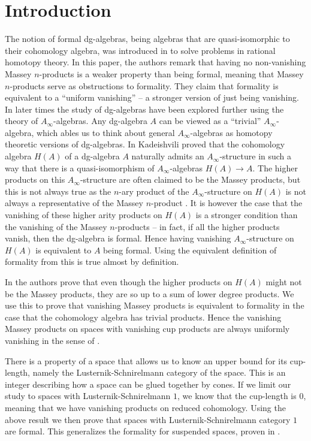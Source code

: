 
\section{Introduction}

The notion of formal dg-algebras, being algebras that are quasi-isomorphic to their cohomology 
algebra, was introduced in \cite{DGMS} to solve problems in rational homotopy theory. In 
this paper, the authors remark that having no non-vanishing Massey 
$n$-products is a weaker property than being formal, meaning that Massey $n$-products 
serve as obstructions to formality. They claim that formality is equivalent to a 
``uniform vanishing'' – a stronger version of just being vanishing. In later times 
the study of dg-algebras have been explored further using the theory of 
$A_\infty$-algebras. Any dg-algebra $A$ can be viewed as a ``trivial'' 
$A_\infty$-algebra, which ables us to think about general $A_\infty$-algebras as homotopy 
theoretic versions of dg-algebras. In \cite{kadeishvili} Kadeishvili proved that the 
cohomology algebra $H(A)$ of a dg-algebra $A$ naturally admits an $A_\infty$-structure in 
such a way that there is a quasi-isomorphism of $A_\infty$-algebras $H(A)\longrightarrow A$. 
The higher products on this $A_\infty$-structure are often claimed to be the Massey 
products, but this is not always true as the $n$-ary product of the $A_\infty$-structure on 
$H(A)$ is not always a representative of the Massey $n$-product \cite{detection}. It is 
however the case that the vanishing of these higher arity products on $H(A)$ is a stronger 
condition than the vanishing of the Massey $n$-products \cite{AHO} – in fact, if all the 
higher products vanish, then the dg-algebra is formal. Hence having vanishing 
$A_\infty$-structure on $H(A)$ is equivalent to $A$ being formal. Using the equivalent 
definition of formality from \cite{keller} this is true almost by definition. 

In \cite{detection} the authors prove that even though the higher products on $H(A)$ might 
not be the Massey products, they are so up to a sum of lower degree products. We use 
this to prove that vanishing Massey products is equivalent to formality in the case 
that the cohomology algebra has trivial products. Hence the vanishing Massey products 
on spaces with vanishing cup products are always uniformly vanishing in the sense of 
\cite{DGMS}. 

There is a property of a space that allows us to know an upper bound for its 
cup-length, namely the Lusternik-Schnirelmann category of the space. This is an 
integer describing how a space can be glued together by cones. If we limit our study 
to spaces with Lusternik-Schnirelmann $1$, we know that the cup-length is $0$, 
meaning that we have vanishing products on reduced cohomology. Using the above result
we then prove that spaces with Lusternik-Schnirelmann category $1$ are formal. This 
generalizes the formality for suspended spaces, proven in \cite{FHT}.

